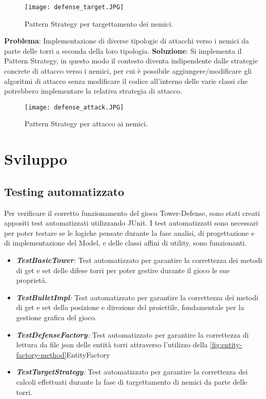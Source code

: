 \documentclass[a4paper,12pt]{report}
\begin{document}
\begin{figure}[H]
    \centering
    \texttt{[image: defense\_target.JPG]}
    \caption{Pattern Strategy per targettamento dei nemici.}
    \label{fig:defense_target}
\end{figure}



\textbf{Problema}:
Implementazione di diverse tipologie di attacchi verso i nemici da parte delle torri a seconda della loro tipologia.
\textbf{Soluzione}:
Si implementa il Pattern Strategy, in questo modo il contesto diventa indipendente dalle strategie concrete di attacco verso i nemici, per cui è possibile aggiungere/modificare gli algoritmi di attacco senza modificare il codice all'interno delle varie classi che potrebbero implementare la relativa strategia di attacco.

\begin{figure}[H]
    \centering
    \texttt{[image: defense\_attack.JPG]}
    \caption{Pattern Strategy per attacco ai nemici.}
    \label{fig:defense_attack}
\end{figure}


\chapter{Sviluppo}
\section{Testing automatizzato}
Per verificare il corretto funzionamento del gioco Tower-Defense, sono stati creati appositi test automatizzati utilizzando JUnit. 
I test automatizzati sono necessari per poter testare se le logiche pensate durante la fase analisi, di progettazione e di implementazione del Model, e delle classi affini di utility, sono funzionanti.

\begin{itemize}
    \item \textit{\textbf{TestBasicTower}:} Test automatizzato per garantire la correttezza dei metodi di get e set delle difese torri per poter gestire durante il gioco le sue proprietà.
    \item \textit{\textbf{TestBulletImpl}:} Test automatizzato per garantire la correttezza dei metodi di get e set della posizione e direzione del proiettile, fondamentale per la gestione grafica del gioco.
    \item \textit{\textbf{TestDefenseFactory}:} Test automatizzato per garantire la correttezza di lettura da file json delle entità torri attraverso l'utilizzo della \ref{fig:entity-factory-method}EntityFactory
    \item \textit{\textbf{TestTargetStrategy}:} Test automatizzato per garantire la correttezza dei calcoli effettuati durante la fase di targettamento di nemici da parte delle torri.
\end{itemize}
\end{document}
